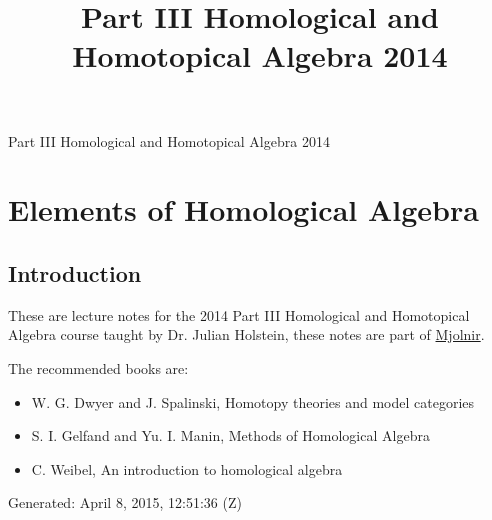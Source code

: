 \documentclass[10pt,]{book}
\title{Part III Homological and Homotopical Algebra 2014}
\author{}
\date{}
\theoremstyle{plain}
\theoremstyle{definition}
\numberwithin{equation}{section}
\begin{document}
\frontmatter
\thispagestyle{empty}
\begin{center}
{\Huge Part III Homological and Homotopical Algebra 2014}
\end{center}\par
{}
\clearpage
\thispagestyle{empty}
\clearpage
\maketitle
\clearpage
\thispagestyle{empty}
\clearpage
\setcounter{tocdepth}{1}
\renewcommand*\contentsname{Contents}
\tableofcontents
\mainmatter
\typeout{************************************************}
\typeout{************************************************}
\chapter[Elements of Homological Algebra]{Elements of Homological Algebra}\label{chap-hom-alg}
\typeout{************************************************}
\typeout{************************************************}
\section[Introduction]{Introduction}\label{sec-introduction}
These are lecture notes for the 2014 Part III Homological and Homotopical Algebra course taught by Dr. Julian Holstein, these notes are part of \href{https://alexjbest.github.io/mjolnir/}{Mjolnir}.%
\par
The recommended books are: 
          \begin{itemize}
\item{}W. G. Dwyer and J. Spalinski, Homotopy theories and model categories\item{}S. I. Gelfand and Yu. I. Manin, Methods of Homological Algebra\item{}C. Weibel, An introduction to homological algebra\end{itemize}

\par

          Generated: April 8, 2015, 12:51:36 (Z)
\typeout{************************************************}
\typeout{************************************************}
\end{document}
